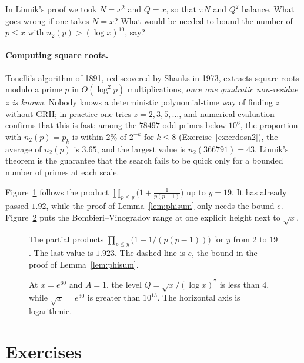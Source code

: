 \begin{think}
In Linnik's proof we took $N=x^2$ and $Q=x$, so that $\pi N$ and $Q^2$ balance. What goes wrong if one takes $N=x$? What would be needed to bound the number of $p\le x$ with $n_2(p)>(\log x)^{10}$, say?
\end{think}

\paragraph{Computing square roots.} Tonelli's algorithm of 1891, rediscovered by Shanks in 1973, extracts square roots modulo a prime $p$ in $O(\log^2p)$ multiplications, \emph{once one quadratic non-residue $z$ is known}. Nobody knows a deterministic polynomial-time way of finding $z$ without GRH; in practice one tries $z=2,3,5,\ldots$, and numerical evaluation confirms that this is fast: among the $78497$ odd primes below $10^6$, the proportion with $n_2(p)=p_k$ is within $2\%$ of $2^{-k}$ for $k\le8$ (Exercise~\ref{ex:erdosn2}), the average of $n_2(p)$ is $3.65$, and the largest value is $n_2(366791)=43$. Linnik's theorem is the guarantee that the search fails to be quick only for a bounded number of primes at each scale.

Figure~\ref{fig:v14-extra-04-a} follows the product $\prod_{p\le y}\bigl(1+\frac1{p(p-1)}\bigr)$ up to $y=19$. It has already passed $1.92$, while the proof of Lemma~\ref{lem:phisum} only needs the bound $e$. Figure~\ref{fig:v14-extra-04-b} puts the Bombieri--Vinogradov range at one explicit height next to $\sqrt x$.

\begin{figure}[ht]
\centering
{}
\caption{The partial products $\prod_{p\le y}\bigl(1+1/(p(p-1))\bigr)$ for $y$ from $2$ to $19$. The last value is $1.923$. The dashed line is $e$, the bound in the proof of Lemma~\ref{lem:phisum}.}
\label{fig:v14-extra-04-a}
\end{figure}

\begin{figure}[ht]
\centering
{}
\caption{At $x=e^{60}$ and $A=1$, the level $Q=\sqrt x/(\log x)^7$ is less than $4$, while $\sqrt x=e^{30}$ is greater than $10^{13}$. The horizontal axis is logarithmic.}
\label{fig:v14-extra-04-b}
\end{figure}

\section{Exercises}

